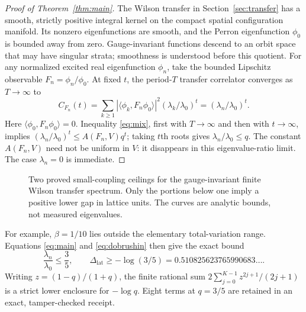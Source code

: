 \documentclass[11pt,a4paper]{article}
\numberwithin{equation}{section}
\begin{document}
\begin{proof}[Proof of Theorem~\ref{thm:main}]
The Wilson transfer in Section~\ref{sec:transfer} has a
smooth, strictly positive integral kernel on the compact
spatial configuration manifold. Its nonzero eigenfunctions
are smooth, and the Perron eigenfunction
\(\phi_0\) is bounded away from zero. Gauge-invariant
functions descend to an orbit space that may have
singular strata; smoothness is understood before this
quotient. For any normalized excited real eigenfunction
\(\phi_n\), take the bounded Lipschitz observable
\(F_n=\phi_n/\phi_0\). At fixed \(t\), the
period-\(T\) transfer correlator converges as
\(T\to\infty\) to
\[
 C_{F_n}(t)=
 \sum_{k\geq1}|\langle\phi_k,F_n\phi_0\rangle|^2
         (\lambda_k/\lambda_0)^t
   =(\lambda_n/\lambda_0)^t.
\]
Here \(\langle\phi_0,F_n\phi_0\rangle=0\).
Inequality \eqref{eq:mix}, first with \(T\to\infty\)
and then with \(t\to\infty\), implies
\((\lambda_n/\lambda_0)^t\leq A(F_n,V)q^t\);
taking \(t\)th roots gives
\(\lambda_n/\lambda_0\leq q\).
The constant \(A(F_n,V)\) need not be uniform in \(V\):
it disappears in this eigenvalue-ratio limit.
The case \(\lambda_n=0\) is immediate.
\end{proof}

\begin{figure}[t]
\centering
{}
\caption{Two proved small-coupling ceilings for the
gauge-invariant finite Wilson transfer spectrum. Only the portions
below one imply a positive lower gap in lattice units. The curves
are analytic bounds, not measured eigenvalues.}
\label{fig:windows}
\end{figure}

For example, \(\beta=1/10\) lies outside the elementary
total-variation range. Equations \eqref{eq:main} and
\eqref{eq:dobrushin} then give the exact bound
\begin{equation}
 \frac{\lambda_n}{\lambda_0}\leq\frac35,\qquad
 \Delta_{\mathrm{lat}}\geq-\log(3/5)
       =0.510825623765990683\ldots .           \label{eq:examplegap}
\end{equation}
Writing \(z=(1-q)/(1+q)\), the finite rational sum
\(2\sum_{j=0}^{K-1}z^{2j+1}/(2j+1)\)
is a strict lower enclosure for \(-\log q\).
Eight terms at \(q=3/5\) are retained in an exact,
tamper-checked receipt.
\end{document}
